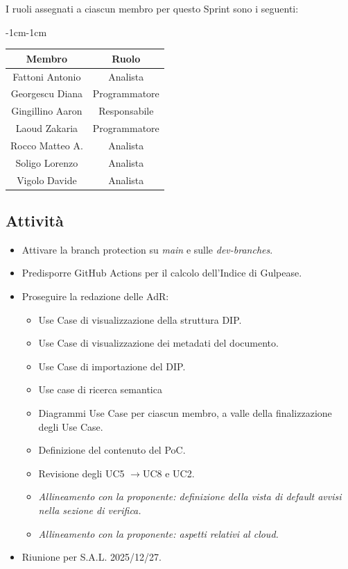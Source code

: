 \documentclass[a4paper,12pt]{article}
\begin{document}
\noindent I ruoli assegnati a ciascun membro per questo Sprint sono i seguenti:
\begin{table}[H]
    \begin{adjustwidth}{-1cm}{-1cm}
    \centering
\begin{tabular}{|c|c|}
    \hline
    \textbf{Membro} & \textbf{Ruolo} \\
    \hline
    Fattoni Antonio & Analista \\
    \hline
    Georgescu Diana & Programmatore \\
    \hline
    Gingillino Aaron & Responsabile \\
    \hline
    Laoud Zakaria & Programmatore \\
    \hline
    Rocco Matteo A. & Analista \\
    \hline
    Soligo Lorenzo & Analista \\
    \hline
    Vigolo Davide & Analista \\
    \hline
\end{tabular}
    \end{adjustwidth}
\end{table}


\subsection{Attività}
\begin{itemize}[noitemsep]
    \item Attivare la branch protection su \textit{main} e sulle \textit{dev-branches}.
    \item Predisporre GitHub Actions per il calcolo dell'Indice di Gulpease.
    \item Proseguire la redazione delle AdR:
    \begin{itemize}[noitemsep]
        \item Use Case di visualizzazione della struttura DIP.
        \item Use Case di visualizzazione dei metadati del documento.
        \item Use Case di importazione del DIP.
        \item Use case di ricerca semantica
        \item Diagrammi Use Case per ciascun membro, a valle della finalizzazione degli Use Case.
        \item Definizione del contenuto del PoC.
        \item Revisione degli UC5 $\rightarrow$UC8 e UC2.
        \item \textit{Allineamento con la proponente: definizione della vista di default avvisi nella sezione di verifica.}
        \item \textit{Allineamento con la proponente: aspetti relativi al cloud.}
    \end{itemize}
    \item Riunione per S.A.L. 2025/12/27.
\end{itemize}
\end{document}
